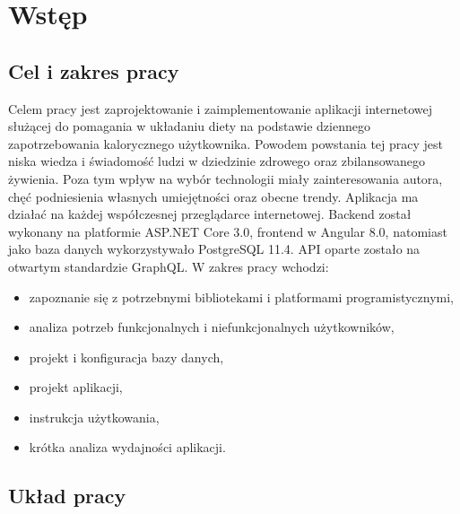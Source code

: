 \chapter{Wstęp}
\section{Cel i zakres pracy}
Celem pracy jest zaprojektowanie i zaimplementowanie aplikacji internetowej służącej do pomagania w układaniu diety na podstawie dziennego zapotrzebowania kalorycznego użytkownika. Powodem powstania tej pracy jest niska wiedza i świadomość ludzi w dziedzinie zdrowego oraz zbilansowanego żywienia.\cite{zywienie} Poza tym wpływ na wybór technologii miały zainteresowania autora, chęć podniesienia własnych umiejętności oraz obecne trendy.\cite{stack} Aplikacja ma działać na każdej współczesnej przeglądarce internetowej. Backend został wykonany na platformie ASP.NET Core 3.0, frontend w Angular 8.0, natomiast jako baza danych wykorzystywało  PostgreSQL 11.4. API oparte zostało na otwartym standardzie GraphQL. W zakres pracy wchodzi:
\begin{itemize}
    \item zapoznanie się z potrzebnymi bibliotekami i platformami programistycznymi,
    \item analiza potrzeb funkcjonalnych i niefunkcjonalnych użytkowników,
    \item projekt i konfiguracja bazy danych,
    \item projekt aplikacji,
    \item instrukcja użytkowania,
    \item krótka analiza wydajności aplikacji.
\end{itemize}
\section{Układ pracy}


